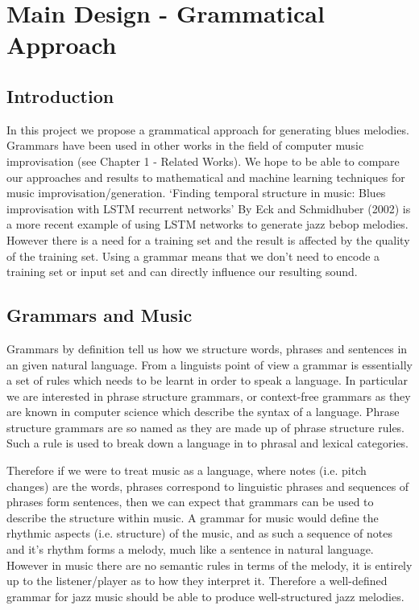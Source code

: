 \documentclass[pdftex,12pt,a4paper]{report}
\begin{document}
\pagebreak

\chapter{Main Design - Grammatical Approach}

\section{Introduction}
In this project we propose a grammatical approach for generating blues melodies. Grammars have been used in other works in the field of computer music improvisation (see Chapter 1 - Related Works). We hope to be able to compare our approaches and results to mathematical and machine learning techniques for music improvisation/generation. `Finding temporal structure in music: Blues improvisation with LSTM recurrent networks' By Eck and Schmidhuber (2002) \cite{eck02} is a more recent example of using LSTM networks to generate jazz bebop melodies. However there is a need for a training set and the result is affected by the quality of the training set. Using a grammar means that we don't need to encode a training set or input set and can directly influence our resulting sound.

\section{Grammars and Music}
Grammars by definition tell us how we structure words, phrases and sentences in an given natural language. From a linguists point of view a grammar is essentially a set of rules which needs to be learnt in order to speak a language. In particular we are interested in phrase structure grammars, or context-free grammars as they are known in computer science which describe the syntax of a language. Phrase structure grammars are so named as they are made up of phrase structure rules. Such a rule is used to break down a language in to phrasal and lexical categories. 

Therefore if we were to treat music as a language, where notes (i.e. pitch changes) are the words, phrases correspond to linguistic phrases and sequences of phrases form sentences, then we can expect that grammars can be used to describe the structure within music. A grammar for music would define the rhythmic aspects (i.e. structure) of the music, and as such a sequence of notes and it's rhythm forms a melody, much like a sentence in natural language. However in music there are no semantic rules in terms of the melody, it is entirely up to the listener/player as to how they interpret it. Therefore a well-defined grammar for jazz music should be able to produce well-structured jazz melodies.
\end{document}
